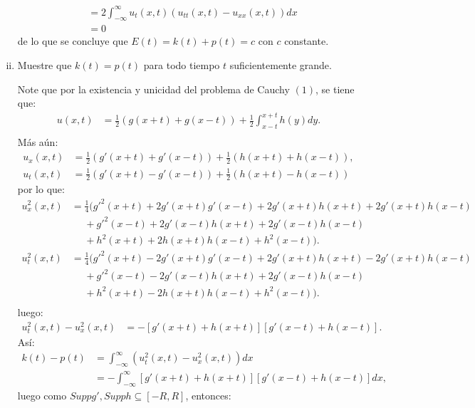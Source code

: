 \begin{homeworkProblem}
\begin{enumerate}[i)]
\begin{solucion}
\begin{align*}
          &=2\int_{-\infty}^{\infty}u_t(x,t)(u_{tt}(x,t)-u_{xx}(x,t))dx\\
          &=0
        \end{align*}
        de lo que se concluye que $E(t)=k(t)+p(t)=c$ con $c$ constante.
        \demostrado
      \end{solucion}
      \newpage
    \item Muestre que $k(t)=p(t)$ para todo tiempo $t$ suficientemente grande.
      \begin{solucion}
        Note que por la existencia y unicidad del problema de Cauchy $(1)$, se tiene que:
        \begin{align*}
          u(x,t)&=\frac{1}{2}(g(x+t)+g(x-t))+\frac{1}{2}\int_{x-t}^{x+t}h(y)dy.\\
        \end{align*}
        Más aún:
        \begin{align*}
          u_x(x,t)&=\frac{1}{2}(g'(x+t)+g'(x-t))+\frac{1}{2}(h(x+t)+h(x-t)),\\
          u_t(x,t)&=\frac{1}{2}(g'(x+t)-g'(x-t))+\frac{1}{2}(h(x+t)-h(x-t))
        \end{align*}
        por lo que:
        \begin{align*}
          u_x^2(x,t)&=\frac{1}{4}( g'^2(x+t)+2g'(x+t)g'(x-t)+2g'(x+t)h(x+t)+2g'(x+t)h(x-t)\\
          &\phantom{=}+g'^2(x-t)+2g'(x-t)h(x+t)+2g'(x-t)h(x-t)\\
          &\phantom{=}+h^2(x+t)+2h(x+t)h(x-t)+h^2(x-t)).\\
          u_t^2(x,t)&=\frac{1}{4}( g'^2(x+t)-2g'(x+t)g'(x-t)+2g'(x+t)h(x+t)-2g'(x+t)h(x-t)\\
          &\phantom{=}+g'^2(x-t)-2g'(x-t)h(x+t)+2g'(x-t)h(x-t)\\
          &\phantom{=}+h^2(x+t)-2h(x+t)h(x-t)+h^2(x-t)).\\
        \end{align*}
        luego:
        \begin{align*}
          u_t^2(x,t)-u_x^2(x,t)&=-[g'(x+t)+h(x+t)][g'(x-t)+h(x-t)].
        \end{align*}
        Así:
        \begin{align*}
          k(t)-p(t)&=\int_{-\infty}^{\infty}(u_t^2(x,t)-u_x^2(x,t))dx\\
          &=-\int_{-\infty}^{\infty}[g'(x+t)+h(x+t)][g'(x-t)+h(x-t)]dx,
        \end{align*}
        luego como $Suppg',Supph\subseteq [-R,R]$, entonces:

\end{solucion}
\end{enumerate}
\end{homeworkProblem}
